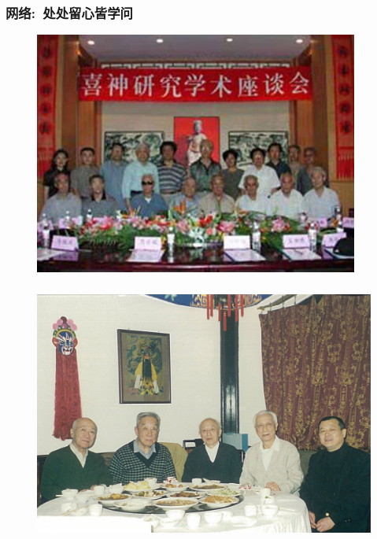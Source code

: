 \documentclass[cjk,slidestop,compress,mathserif,blue]{beamer}
\begin{document}
\frame
{
	\frametitle{网络:~处处留心皆学问}
\begin{minipage}{0.48\textwidth}
\begin{figure}[h!]
\centering
\vspace{-0.05in}
\includegraphics[height=0.70\textwidth,width=0.95\textwidth, clip]{Figures/PekOpe_Xi.jpg}
\label{Xishen}
\end{figure}
\end{minipage}
\begin{minipage}{0.50\textwidth}
\fontsize{4.5pt}{4.0pt}\selectfont{
}
\end{minipage}
}


\frame
{
	\frametitle{}
\begin{figure}[h!]
\centering
\includegraphics[height=0.60\textwidth,width=1.0\textwidth,viewport=0 0 500 300,clip]{Figures/Collect_Zhu-Liu-Wu-Wang.jpg}
\caption{\fontsize{7.3pt}{3.9pt}}
\label{Collect_Wang}
\end{figure}
}
\end{document}
